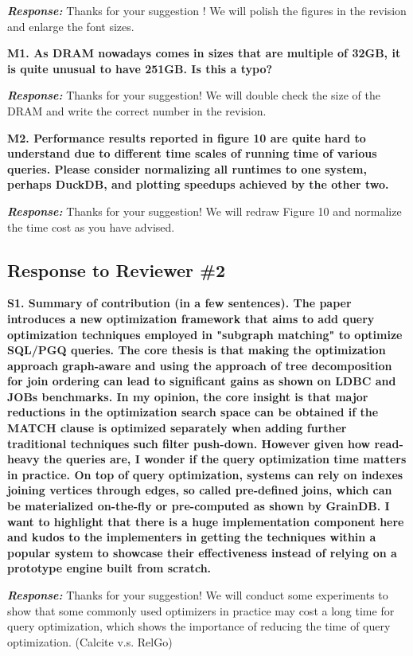 \textbf{\textit{Response: }}
Thanks for your suggestion ! We will polish the figures in the revision and enlarge the font sizes.


\textbf{M1. As DRAM nowadays comes in sizes that are multiple of 32GB, it is quite unusual to have 251GB. Is this a typo?}

\textbf{\textit{Response: }}
Thanks for your suggestion! We will double check the size of the DRAM and write the correct number in the revision.

\textbf{M2. Performance results reported in figure 10 are quite hard to understand due to different time scales of running time of various queries. Please consider normalizing all runtimes to one system, perhaps DuckDB, and plotting speedups achieved by the other two.}

\textbf{\textit{Response: }}
Thanks for your suggestion! We will redraw Figure 10 and normalize the time cost as you have advised.


\subsection{Response to Reviewer \#2}

\textbf{S1. Summary of contribution (in a few sentences). 
The paper introduces a new optimization framework that aims to add query optimization techniques employed in "subgraph matching" to optimize SQL/PGQ queries. The core thesis is that making the optimization approach graph-aware and using the approach of tree decomposition for join ordering can lead to significant gains as shown on LDBC and JOBs benchmarks.
In my opinion, the core insight is that major reductions in the optimization search space can be obtained if the MATCH clause is optimized separately when adding further traditional techniques such filter push-down. However given how read-heavy the queries are, I wonder if the query optimization time matters in practice. On top of query optimization, systems can rely on indexes joining vertices through edges, so called pre-defined joins, which can be materialized on-the-fly or pre-computed as shown by GrainDB. I want to highlight that there is a huge implementation component here and kudos to the implementers in getting the techniques within a popular system to showcase their effectiveness instead of relying on a prototype engine built from scratch.}

\textbf{\textit{Response: }}
Thanks for your suggestion! We will conduct some experiments to show that some commonly used optimizers in practice may cost a long time for query optimization, which shows the importance of reducing the time of query optimization. (Calcite v.s. RelGo)


